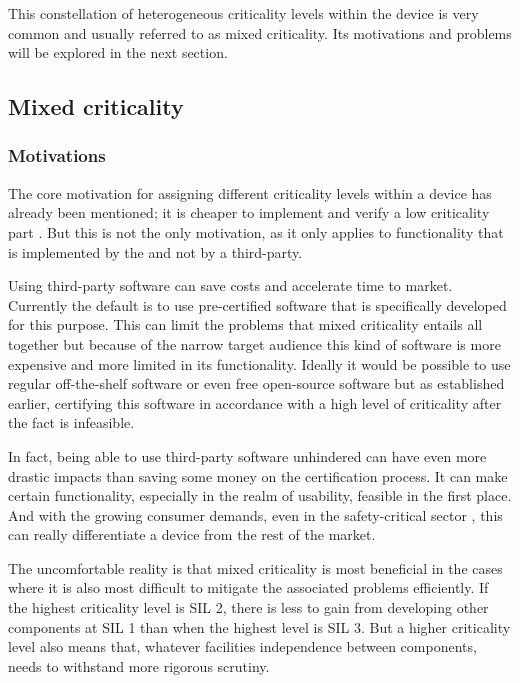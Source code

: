 This constellation of heterogeneous criticality levels within the device is very common and usually referred to as mixed criticality. Its motivations and problems will be explored in the next section.
\subsection{Mixed criticality} \label{mixed-criticality}
\subsubsection{Motivations}
The core motivation for assigning different criticality levels within a device has already been mentioned; it is cheaper to implement and verify a low criticality part \cite{perez2013safety}. But this is not the only motivation, as it only applies to functionality that is implemented by the \mfg{} and not by a third-party.

Using third-party software can save costs and accelerate time to market. Currently the default is to use pre-certified software that is specifically developed for this purpose. This can limit the problems that mixed criticality entails all together but because of the narrow target audience this kind of software is more expensive and more limited in its functionality. Ideally it would be possible to use regular off-the-shelf software or even free open-source software but as established earlier, certifying this software in accordance with a high level of criticality after the fact is infeasible.

In fact, being able to use third-party software unhindered can have even more drastic impacts than saving some money on the certification process. It can make certain functionality, especially in the realm of usability, feasible in the first place. And with the growing consumer demands, even in the safety-critical sector \cite{ITA.May2016}, this can really differentiate a device from the rest of the market.

The uncomfortable reality is that mixed criticality is most beneficial in the cases where it is also most difficult to mitigate the associated problems efficiently. If the highest criticality level is SIL 2, there is less to gain from developing other components at SIL 1 than when the highest level is SIL 3. But a higher criticality level also means that, whatever facilities independence between components,  needs to withstand more rigorous scrutiny. 

